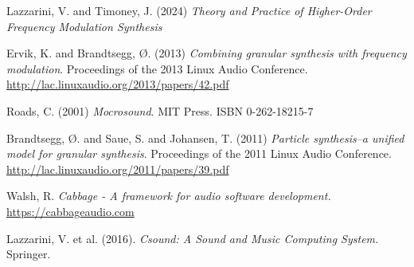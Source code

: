\documentclass[runningheads,a4paper]{llncs}
\begin{document}
\begin{thebibliography}{4}



 Lazzarini, V. and Timoney, J. (2024) \emph{Theory and Practice of Higher-Order Frequency Modulation
	Synthesis}

 Ervik, K. and Brandtsegg, Ø. (2013) \emph{Combining granular synthesis with frequency modulation}. Proceedings of the 2013 Linux Audio Conference. \url{http://lac.linuxaudio.org/2013/papers/42.pdf}

 Roads, C. (2001) \emph{Mocrosound}. MIT Press.  ISBN 0-262-18215-7

 Brandtsegg, Ø. and Saue, S. and Johansen, T. (2011) \emph{Particle synthesis–a unified model for granular synthesis}. Proceedings of the 2011 Linux Audio Conference. \url{http://lac.linuxaudio.org/2011/papers/39.pdf}

 Walsh, R. \emph{Cabbage - A framework for audio software development.} \url{https://cabbageaudio.com}

 Lazzarini, V. et al. (2016). \emph{Csound: A Sound and Music Computing System.} Springer.



\end{thebibliography}
\end{document}
